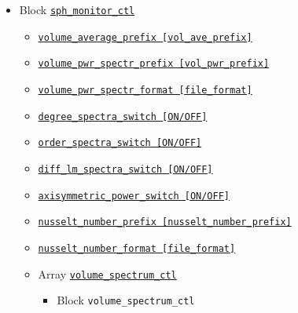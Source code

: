 \begin{itemize}
\begin{itemize}
\begin{itemize}
			{\tt Legendre\_trans\_loop\_ctl [Leg\_Loop]}
		\end{itemize}
%
	\end{itemize}
%
\item Block \hyperref[href_t:sph_monitor_ctl]{\tt sph\_monitor\_ctl}
	\begin{itemize} \label{href_i:sph_monitor_ctl}
	\item \hyperref[href_t:volume_average_prefix]
			{\tt volume\_average\_prefix        [vol\_ave\_prefix]}
	\item \hyperref[href_t:volume_pwr_spectr_prefix]
			{\tt volume\_pwr\_spectr\_prefix    [vol\_pwr\_prefix]}
	\item \hyperref[href_t:volume_pwr_spectr_format]
		{\tt volume\_pwr\_spectr\_format    [file\_format]}
	\item \hyperref[href_t:degree_spectra_switch]
		{\tt degree\_spectra\_switch           [ON/OFF]}
	\item \hyperref[href_t:order_spectra_switch]
		{\tt order\_spectra\_switch           [ON/OFF]}
	\item \hyperref[href_t:diff_lm_spectra_switch]
		{\tt diff\_lm\_spectra\_switch           [ON/OFF]}
	\item \hyperref[href_t:axisymmetric_power_switch]
		{\tt axisymmetric\_power\_switch           [ON/OFF]}
%
	\item \hyperref[href_t:nusselt_number_prefix]
			{\tt nusselt\_number\_prefix        [nusselt\_number\_prefix]}
	\item \hyperref[href_t:nusselt_number_format]
			{\tt nusselt\_number\_format    [file\_format]}
%
	\item Array \hyperref[href_t:volume_spectrum_ctl]{\tt volume\_spectrum\_ctl}
		\begin{itemize}
		\item Block \verb|volume_spectrum_ctl|
\end{itemize}
\end{itemize}
\end{itemize}
